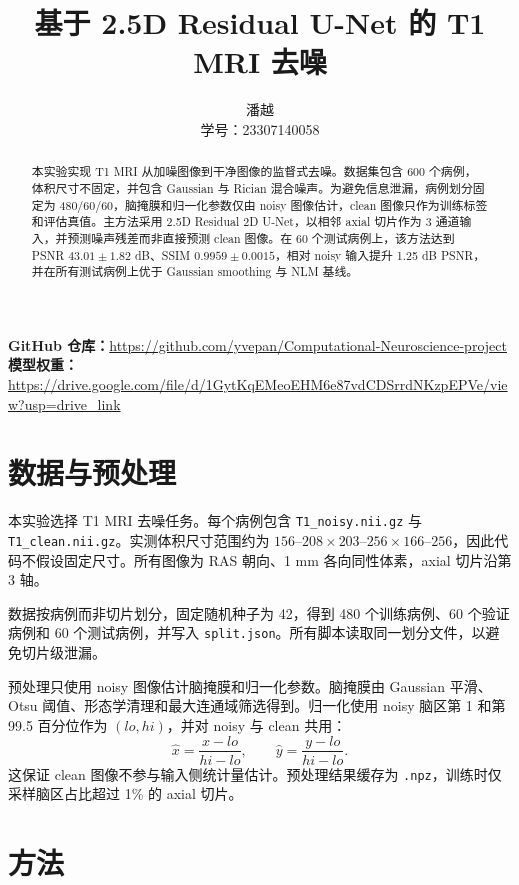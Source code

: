 \documentclass{article}
\title{基于 2.5D Residual U-Net 的 T1 MRI 去噪}
\author{潘越 \\ 学号：23307140058}
\begin{document}
\maketitle

\begin{center}
\small
\textbf{GitHub 仓库：}\url{https://github.com/yvepan/Computational-Neuroscience-project}\\
\textbf{模型权重：}\url{https://drive.google.com/file/d/1GytKqEMeoEHM6e87vdCDSrrdNKzpEPVe/view?usp=drive_link}
\end{center}

\begin{abstract}
本实验实现 T1 MRI 从加噪图像到干净图像的监督式去噪。数据集包含 600 个病例，体积尺寸不固定，并包含 Gaussian 与 Rician 混合噪声。为避免信息泄漏，病例划分固定为 480/60/60，脑掩膜和归一化参数仅由 noisy 图像估计，clean 图像只作为训练标签和评估真值。主方法采用 2.5D Residual 2D U-Net，以相邻 axial 切片作为 3 通道输入，并预测噪声残差而非直接预测 clean 图像。在 60 个测试病例上，该方法达到 PSNR $43.01\pm1.82$ dB、SSIM $0.9959\pm0.0015$，相对 noisy 输入提升 1.25 dB PSNR，并在所有测试病例上优于 Gaussian smoothing 与 NLM 基线。
\end{abstract}

\section{数据与预处理}

本实验选择 T1 MRI 去噪任务。每个病例包含 \texttt{T1\_noisy.nii.gz} 与 \texttt{T1\_clean.nii.gz}。实测体积尺寸范围约为 $156$--$208 \times 203$--$256 \times 166$--$256$，因此代码不假设固定尺寸。所有图像为 RAS 朝向、1 mm 各向同性体素，axial 切片沿第 3 轴。

数据按病例而非切片划分，固定随机种子为 42，得到 480 个训练病例、60 个验证病例和 60 个测试病例，并写入 \texttt{split.json}。所有脚本读取同一划分文件，以避免切片级泄漏。

预处理只使用 noisy 图像估计脑掩膜和归一化参数。脑掩膜由 Gaussian 平滑、Otsu 阈值、形态学清理和最大连通域筛选得到。归一化使用 noisy 脑区第 1 和第 99.5 百分位作为 $(lo, hi)$，并对 noisy 与 clean 共用：
\begin{equation}
  \hat{x}=\frac{x-lo}{hi-lo}, \qquad \hat{y}=\frac{y-lo}{hi-lo}.
\end{equation}
这保证 clean 图像不参与输入侧统计量估计。预处理结果缓存为 \texttt{.npz}，训练时仅采样脑区占比超过 1\% 的 axial 切片。

\section{方法}
\end{document}
